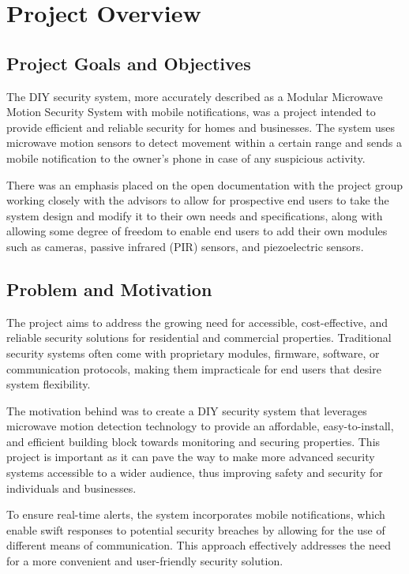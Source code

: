 \section{Project Overview}\label{sec:project-overview}

\subsection{Project Goals and Objectives}\label{subsec:project-goals-and-objectives}
The \brand{} DIY security system, more accurately described as a Modular Microwave Motion
Security System with mobile notifications, was a project intended to provide efficient
and reliable security for homes and businesses. The system uses microwave motion
sensors to detect movement within a certain range and sends a mobile notification to
the owner's phone in case of any suspicious activity.

There was an emphasis placed on the open documentation with the project group working
closely with the advisors to allow for prospective end users to take the system design
and modify it to their own needs and specifications, along with allowing some degree of
freedom to enable end users to add their own modules such as cameras, passive infrared
(PIR) sensors, and piezoelectric sensors.

\subsection{Problem and Motivation}\label{subsec:problem-and-motivation}

The \brand{} project aims to address the growing need for accessible, cost-effective,
and reliable security solutions for residential and commercial properties.
Traditional security systems often come with proprietary modules, firmware, software,
or communication protocols, making them impracticale for end users that desire system flexibility.

The motivation behind \brand{} was to create a DIY security system that leverages
microwave motion detection technology to provide an affordable, easy-to-install, and
efficient building block towards monitoring and securing properties. This project is important as
it can pave the way to make more advanced security systems accessible to a wider
audience, thus improving safety and security for individuals and businesses.

To ensure real-time alerts, the system incorporates mobile notifications, which enable
swift responses to potential security breaches by allowing for the use of different means of communication.
This approach effectively addresses the need for a more convenient and user-friendly security solution.

